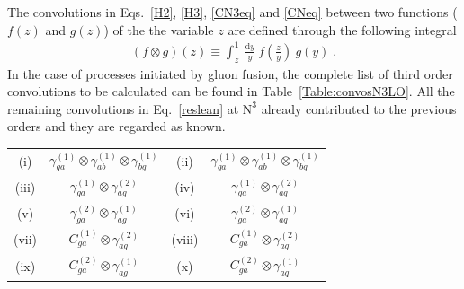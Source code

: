 \documentclass[12pt]{article}
\def\beeq{\begin{eqnarray}}
\def\eeeq{\end{eqnarray}}
\DeclareRobustCommand{\rd}{\ensuremath{\mathrm{d}}}
\DeclareRobustCommand{\LO}{\text{LO}\xspace}
\DeclareRobustCommand{\N}[1]{\ensuremath{\text{N}^{#1}}} %
\begin{document}
\begin{appendix}
The convolutions in Eqs.~\eqref{H2}, \eqref{H3}, \eqref{CN3eq} and \eqref{CNeq} between two functions ($f(z)$ and $g(z)$) of the the variable $z$ are defined through the following integral
\beeq
\left( f \otimes g \right)(z) \equiv \int^{1}_{z}~\frac{\rd y}{y}~f\left(\frac{z}{y}\right)~g(y)\;.
\eeeq
In the case of processes initiated by gluon fusion, the complete list of third order convolutions to be calculated can be found in Table~\ref{Table:convosN3LO}. All the remaining convolutions in Eq.~\eqref{reslean} at \N3\LO already  contributed to the previous orders and they are regarded as known.

\begin{table}
\centering
\renewcommand{\arraystretch}{1.5}
\begin{tabular}{ |c|c||c|c| }
\hline
\multirow{1}{*}{(i)} 

& $\gamma^{(1)}_{ga}\otimes\gamma^{(1)}_{a b}\otimes\gamma^{(1)}_{bg}$

& \multirow{1}{*}{(ii)} 

& $\gamma^{(1)}_{ga}\otimes\gamma^{(1)}_{ab}\otimes\gamma^{(1)}_{bq}$  \\


\multirow{1}{*}{(iii)} 

& $\gamma^{(1)}_{ga}\otimes\gamma^{(2)}_{ag}$

& \multirow{1}{*}{(iv)} 

& $\gamma^{(1)}_{ga}\otimes\gamma^{(2)}_{aq}$  \\

\multirow{1}{*}{(v)} 

& $\gamma^{(2)}_{ga}\otimes\gamma^{(1)}_{ag}$

& \multirow{1}{*}{(vi)} 

& $\gamma^{(2)}_{ga}\otimes\gamma^{(1)}_{aq}$  \\

\multirow{1}{*}{(vii)} 

& $C^{(1)}_{ga}\otimes\gamma^{(2)}_{ag}$

& \multirow{1}{*}{(viii)} 

& $C^{(1)}_{ga}\otimes\gamma^{(2)}_{aq}$  \\

\multirow{1}{*}{(ix)} 

& $C^{(2)}_{ga}\otimes\gamma^{(1)}_{ag}$

& \multirow{1}{*}{(x)} 

& $C^{(2)}_{ga}\otimes\gamma^{(1)}_{aq}$  \\


\end{tabular}
\end{table}
\end{appendix}
\end{document}
